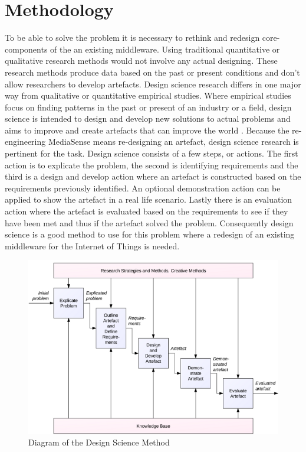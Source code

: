 \chapter{Methodology}
To be able to solve the problem it is necessary to rethink and redesign core-components of the an existing middleware. Using traditional quantitative or qualitative research methods would not involve any actual designing. These research methods produce data based on the past or present conditions and don't allow researchers to develop artefacts.
Design science research differs in one major way from qualitative or quantitative empirical studies. Where empirical studies focus on finding patterns in the past or present of an industry or a field, design science is intended to design and develop new solutions to actual problems \cite{bider2012design} and aims to improve and create artefacts that can improve the world \cite{johannesson2012design}. Because the re-engineering MediaSense means re-designing an artefact, design science research is pertinent for the task. 
Design science consists of a few steps, or actions. The first action is to explicate the problem, the second is identifying requirements and the third is a design and develop action where an artefact is constructed based on the requirements previously identified. An optional demonstration action can be applied to show the artefact in a real life scenario. Lastly there is an evaluation action where the artefact is evaluated based on the requirements to see if they have been met and thus if the artefact solved the problem. Consequently design science is a good method to use for this problem where a redesign of an existing middleware for the Internet of Things is needed.

\begin{figure}[h!]
	\centering
    	\includegraphics[scale=0.50]{part_3/design_science.png}
		\caption{Diagram of the Design Science Method \cite{johannesson2012design}} 
		\label{ds}
\end{figure}

